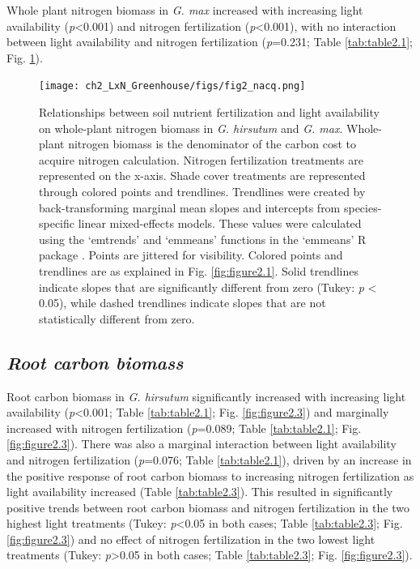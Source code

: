 Whole plant nitrogen biomass in \textit{G. max} increased with increasing light availability (\textit{p}<0.001) and nitrogen fertilization (\textit{p}<0.001), with no interaction between light availability and nitrogen fertilization (\textit{p}=0.231; Table \ref{tab:table2.1}; Fig. \ref{fig:figure2.2}).

\newpage
\begin{landscape}
\begin{figure}
    \texttt{[image: ch2\_LxN\_Greenhouse/figs/fig2\_nacq.png]}
    \centering
    \caption[Relationships between soil nitrogen fertilization and light availability on whole-plant nitrogen biomass in \textit{G. hirsutum} and \textit{G. max}]{Relationships between soil nutrient fertilization and light availability on whole-plant nitrogen biomass in \textit{G. hirsutum} and \textit{G. max}. Whole-plant nitrogen biomass is the denominator of the carbon cost to acquire nitrogen calculation. Nitrogen fertilization treatments are represented on the x-axis. Shade cover treatments are represented through colored points and trendlines. Trendlines were created by back-transforming marginal mean slopes and intercepts from species-specific linear mixed-effects models. These values were calculated using the ‘emtrends’ and ‘emmeans’ functions in the ‘emmeans’ R package . Points are jittered for visibility. Colored points and trendlines are as explained in Fig. \ref{fig:figure2.1}. Solid trendlines indicate slopes that are significantly different from zero (Tukey: \textit{p} < 0.05), while dashed trendlines indicate slopes that are not statistically different from zero.}
    \label{fig:figure2.2}
    \small
\end{figure}
\end{landscape}
\clearpage

\newpage
\subsection{\textit{Root carbon biomass}}
\noindent Root carbon biomass in \textit{G. hirsutum} significantly increased with increasing light availability (\textit{p}<0.001; Table \ref{tab:table2.1}; Fig. \ref{fig:figure2.3}) and marginally increased with nitrogen fertilization (\textit{p}=0.089; Table \ref{tab:table2.1}; Fig. \ref{fig:figure2.3}). There was also a marginal interaction between light availability and nitrogen fertilization (\textit{p}=0.076; Table \ref{tab:table2.1}), driven by an increase in the positive response of root carbon biomass to increasing nitrogen fertilization as light availability increased (Table \ref{tab:table2.3}). This resulted in significantly positive trends between root carbon biomass and nitrogen fertilization in the two highest light treatments (Tukey: \textit{p}<0.05 in both cases; Table \ref{tab:table2.3}; Fig. \ref{fig:figure2.3}) and no effect of nitrogen fertilization in the two lowest light treatments (Tukey: \textit{p}>0.05 in both cases; Table \ref{tab:table2.3}; Fig. \ref{fig:figure2.3}). 

